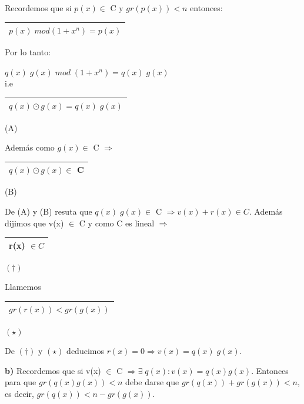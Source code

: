 \documentclass[12pt,a4paper]{report}
\begin{document}
  			\vspace{3mm}
  			\par Recordemos que si $p(x) \in$ C y $gr(p(x)) < n$ entonces: \begin{tabular}{|c|} \hline $p(x) \; mod (1+ x^{n}) = p(x)$ \\\hline \end{tabular}

  			\vspace{3mm}
  			\par Por lo tanto:
  			\begin{center}
  				$ q(x) \; g(x) \; mod \; (1 + x^{n}) = q(x) \; g(x) $ \\
  				\vspace{3mm}
  				i.e \begin{tabular}{|c|} \hline $ q(x) \odot g(x) = q(x) \; g(x) $ \\\hline \end{tabular} (A)
  			\end{center}
  			\par Además como $g(x) \in$ C $\Rightarrow$ \begin{tabular}{|c|} \hline $q(x) \odot g(x) \in$ C \\ \hline \end{tabular} (B)

  			\vspace{3mm}
  			\par De (A) y (B) resuta que $q(x) \; g(x) \in$ C $\Rightarrow v(x) + r(x) \in C$. Además dijimos que v(x) $\in$ C y como C es lineal $\Rightarrow$ \begin{tabular}{|c|} \hline r(x) $\in C$ \\\hline \end{tabular} $(\dag)$
  			\vspace{3mm}
  			\par Llamemos \begin{tabular}{|c|} \hline $gr(r(x)) < gr(g(x))$ \\ \hline \end{tabular} $(\star)$

  			\vspace{5mm}
  			\par De $(\dag)$ y $(\star)$ deducimos $r(x) = 0 \Rightarrow v(x) = q(x) \; g(x)$.

  			\vspace{5mm}
  			\textbf{b)} Recordemos que si v(x) $\in$ C $\Rightarrow \exists \; q(x) : v(x) = q(x) g(x)$. Entonces para que $gr(q(x) g(x)) < n$ debe darse que $gr(q(x)) + gr(g(x)) < n$, es decir, $gr(q(x)) < n - gr(g(x))$.
\end{document}
